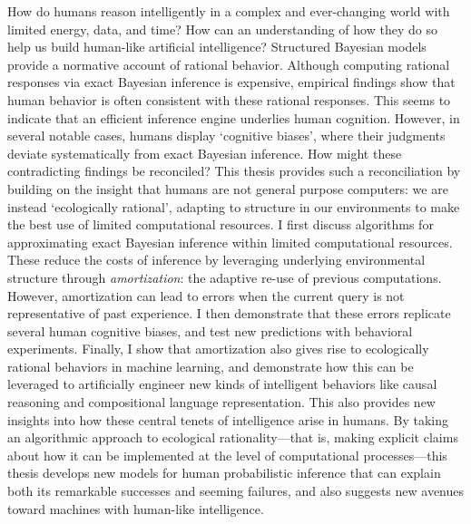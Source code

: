 

How do humans reason intelligently in a complex and ever-changing world with limited energy, data, and time? 
How can an understanding of how they do so help us build human-like artificial intelligence?
Structured Bayesian models provide a normative account of rational behavior. Although computing rational responses via exact Bayesian inference is expensive, empirical findings show that human behavior is often consistent with these rational responses. 
This seems to indicate that an efficient inference engine underlies human cognition. 
However, in several notable cases, humans display `cognitive biases', where their judgments deviate systematically from exact Bayesian inference. 
How might these contradicting findings be reconciled? 
This thesis provides such a reconciliation by building on the insight that humans are not general purpose computers: we are instead `ecologically rational', adapting to structure in our environments to make the best use of limited computational resources. 
I first discuss %
algorithms for approximating exact Bayesian inference within limited computational resources. 
These reduce the costs of inference by leveraging underlying environmental structure through \textit{amortization}: the adaptive re-use of previous computations. 
However, amortization can lead to errors when the current query is not representative of past experience. 
I then demonstrate that these errors replicate several human cognitive biases, and test new predictions with behavioral experiments. 
Finally, I show that amortization also gives rise to ecologically rational behaviors in machine learning, and demonstrate how this can be leveraged to artificially engineer new kinds of intelligent behaviors like causal reasoning and compositional language representation. 
This also provides new insights into how these central tenets of intelligence arise in humans. 
By taking an algorithmic approach to ecological rationality---that is, making explicit claims about how it can be implemented at the level of computational processes---this thesis develops new models for human probabilistic inference that can explain both its remarkable successes and seeming failures, and also suggests new avenues toward machines with human-like intelligence.